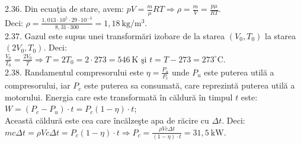 2.36. Din ecuaţia de stare, avem: $p V=\frac{m}{\mu} R T \Rightarrow \rho=\frac{m}{V}=\frac{p \mu}{R T}$.\\ Deci: $\rho=\frac{1,013 \cdot 10^{5} \cdot 29 \cdot 10^{-3}}{8,31 \cdot 300}=1,18 \mathrm{~kg} / \mathrm{m}^{3}$.\\

2.37. Gazul este supus unei transformări izobare de la starea $\left(V_{0}, T_{0}\right)$ la starea $\left(2 V_{0}, T_{0}\right)$. Deci:\\ $\frac{V_{0}}{T_{0}}=\frac{2 V_{0}}{T} \Rightarrow T=2 T_{0}=2 \cdot 273=546 \mathrm{~K} \text { şi } t=T-273=273^{\circ} \mathrm{C}$.\\

2.38. Randamentul compresorului este $\eta=\frac{P_{u}}{P_{c}}$ unde $P_{u}$ este puterea utilă a compresorului, iar $P_{c}$ este puterea sa consumată, care reprezintă puterea utilă a motorului. Energia care este transformată în căldură în timpul $t$ este:\\ $W=\left(P_{c}-P_{u}\right) \cdot t=P_{c}(1-\eta) \cdot t$;\\ Această căldură este cea care încălzeşte apa de răcire cu $\Delta t$. Deci:\\ $m c \Delta t=\rho V c \Delta t=P_{c}(1-\eta) \cdot t \Rightarrow P_{c}=\frac{\rho V c \Delta t}{(1-\eta) \cdot t}=31,5 \mathrm{~kW}$.\\

